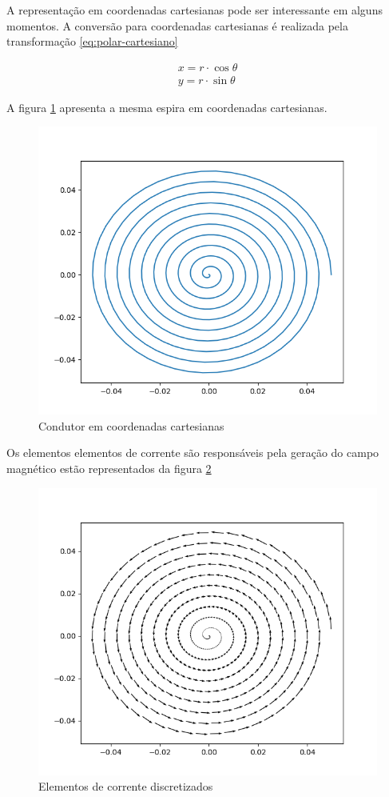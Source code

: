 \documentclass[
	article,			%
	11pt,				%
	oneside,			%
	a4paper,			%
	english,			%
	brazil,				%
	sumario=tradicional
	]{abntex2}
\begin{document}
A representação em coordenadas cartesianas pode ser interessante em alguns momentos. A conversão para coordenadas cartesianas é realizada pela transformação \ref{eq:polar-cartesiano}

\begin{equation}[h] \label{eq:polar-cartesiano}
	\begin{array}{l}
	x = r \cdot \cos \theta\\ 
	y = r \cdot \sin \theta
	\end{array}
\end{equation}

A figura \ref{fig:espiracartesiana} apresenta a mesma espira em coordenadas cartesianas.

\begin{figure}[h]
	\centering
	\includegraphics[width=0.7\linewidth]{figures/espiracartesiana}
	\caption[Condutor em coordenadas cartesianas]{Condutor em coordenadas cartesianas}
	\label{fig:espiracartesiana}
\end{figure}

Os elementos elementos de corrente são responsáveis pela geração do campo magnético estão representados da figura \ref{fig:elementosdecondutor}

\begin{figure}[h]
	\centering
	\includegraphics[width=0.7\linewidth]{figures/elementosdecondutor}
	\caption[Elementos de corrente discretizados]{Elementos de corrente discretizados}
	\label{fig:elementosdecondutor}
\end{figure}
\end{document}
